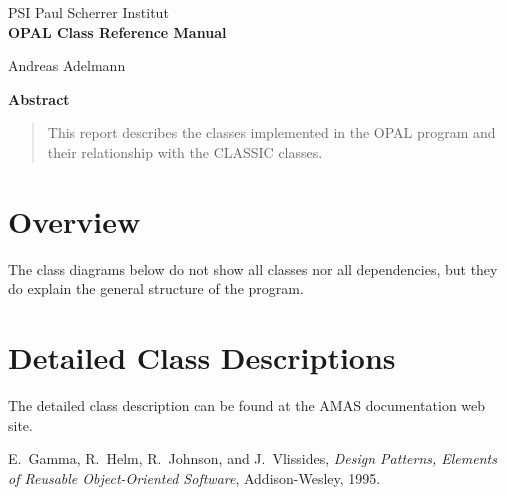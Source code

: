 \documentclass[11pt,a4paper]{report}
\begin{document}
\begin{center}
PSI Paul Scherrer Institut\\
\vspace{3cm}
{\huge {\bf OPAL Class Reference Manual}}

\vspace{1cm}
Andreas Adelmann

\vspace{2cm}
{\bf Abstract}
\end{center}

\begin{quote}
  This report describes the classes implemented in the OPAL program
  and their relationship with the CLASSIC classes.
\end{quote}

\clearpage

\setlength{\unitlength}{0.8pt}

\tableofcontents
\listoffigures


\chapter{Overview}
The class diagrams below do not show all classes nor all dependencies,
but they do explain the general structure of the program.




\chapter{Detailed Class Descriptions}
The detailed class description can be found at the AMAS documentation web site.


\clearpage
\begin{thebibliography}{99}

  E.~Gamma, R.~Helm, R.~Johnson, and J.~Vlissides,
  \textit{Design Patterns, Elements of Reusable Object-Oriented
    Software},
  Addison-Wesley, 1995.

\end{thebibliography}

\end{document}
